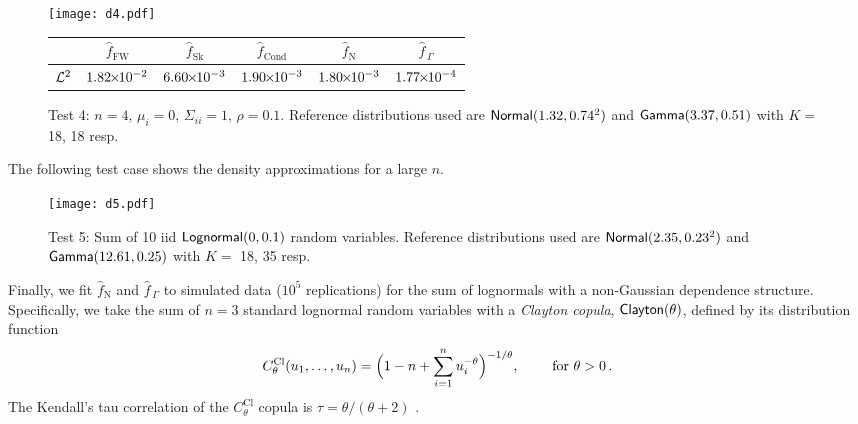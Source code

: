 \begin{figure}[H]
\centering
\texttt{[image: d4.pdf]}

\vspace{4mm}

\begin{tabular}{c|c|c|c|c|c|}
\cline{2-6}
                         & $\widehat{f}_{\mathrm{FW}}$  & $\widehat{f}_{\mathrm{Sk}}$ & $\widehat{f}_{\mathrm{Cond}}$ & $\widehat{f}_{\mathrm{N}}$  & $\widehat{f}_{\,\Gamma}$ \\ \hline
\multicolumn{1}{|c|}{$\mathcal{L}^2$} & $1.82 {\mkern-2mu\times\mkern-2mu} 10^{-2}$ & $6.60 {\mkern-2mu\times\mkern-2mu} 10^{-3}$ & $1.90 {\mkern-2mu\times\mkern-2mu} 10^{-3}$ & $1.80 {\mkern-2mu\times\mkern-2mu} 10^{-3}$ & $1.77 {\mkern-2mu\times\mkern-2mu} 10^{-4}$ \\ \hline
\end{tabular}
\caption*{Test 4: $n=4$, $\mu_i = 0$, $\Sigma_{ii}=1$, $\rho = 0.1$. Reference distributions used are $\mathsf{Normal}(1.32,0.74^2)$ and $\mathsf{Gamma}(3.37,0.51)$ with $K =$ 18, 18 resp.}
\end{figure}



The following test case shows the density approximations for a large $n$.


\begin{figure}[H]
\centering
\texttt{[image: d5.pdf]}
\caption*{Test 5: Sum of 10 iid $\mathsf{Lognormal}(0,0.1)$ random variables. Reference distributions used are $\mathsf{Normal}(2.35,0.23^2)$ and $\mathsf{Gamma}(12.61,0.25)$ with $K =$ 18, 35 resp.}
\end{figure}


Finally, we fit $\widehat{f}_{\mathrm{N}}$ and $\widehat{f}_{\,\Gamma}$ to simulated data ($10^5$ replications) for the sum of lognormals with a non-Gaussian dependence structure. Specifically, we take the sum of $n = 3$ standard lognormal random variables with a \emph{Clayton copula}, $\mathsf{Clayton}(\theta)$, defined by its distribution function
\[
C^{\text{Cl}}_\theta(u_1, \dots, u_n) = \Bigl( 1 - n + \sum_{i=1}^n u_i^{-\theta} \Bigr)^{-1/\theta}, \qquad \text{ for } \theta > 0 \,.
\]
The Kendall's tau correlation of the $C^{\text{Cl}}_\theta$ copula is $\tau = \theta / (\theta + 2)$ \cite{mcneil2015quantitative}.


